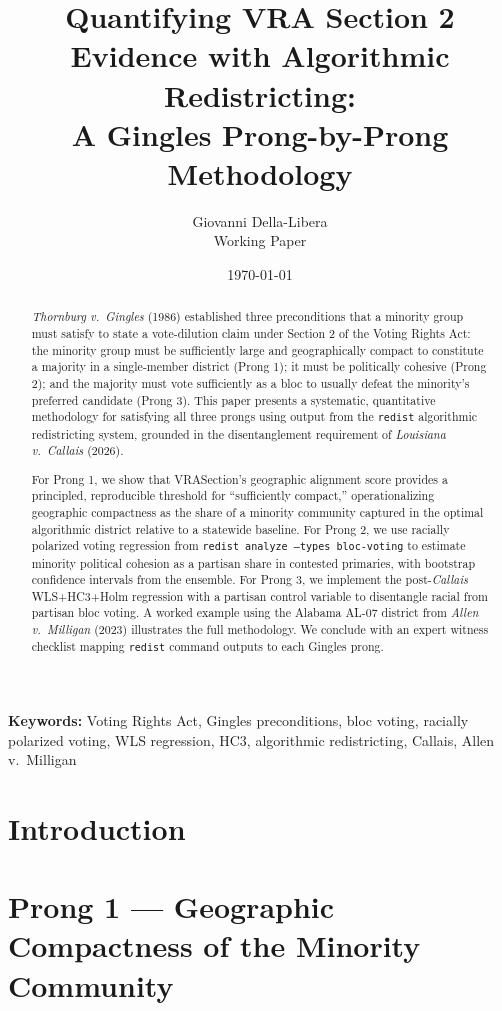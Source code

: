\documentclass[12pt]{article}
\title{Quantifying VRA Section 2 Evidence with Algorithmic Redistricting:\\
A Gingles Prong-by-Prong Methodology}
\author{Giovanni Della-Libera\\
\small{Working Paper}}
\date{\today}
\begin{document}
\maketitle

\begin{abstract}
\textit{Thornburg v.\ Gingles} (1986) established three preconditions
that a minority group must satisfy to state a vote-dilution claim under
Section 2 of the Voting Rights Act: the minority group must be sufficiently
large and geographically compact to constitute a majority in a
single-member district (Prong 1); it must be politically cohesive (Prong 2);
and the majority must vote sufficiently as a bloc to usually defeat the
minority's preferred candidate (Prong 3).  This paper presents a
systematic, quantitative methodology for satisfying all three prongs using
output from the \texttt{redist} algorithmic redistricting system, grounded in
the disentanglement requirement of \textit{Louisiana v.\ Callais} (2026).

For Prong 1, we show that VRASection's geographic alignment score provides
a principled, reproducible threshold for ``sufficiently compact,'' operationalizing
geographic compactness as the share of a minority community captured in the
optimal algorithmic district relative to a statewide baseline.  For Prong 2,
we use racially polarized voting regression from \texttt{redist analyze
--types bloc-voting} to estimate minority political cohesion as a partisan
share in contested primaries, with bootstrap confidence intervals from the
ensemble.  For Prong 3, we implement the post-\textit{Callais} WLS+HC3+Holm
regression with a partisan control variable to disentangle racial from partisan
bloc voting.  A worked example using the Alabama AL-07 district from
\textit{Allen v.\ Milligan} (2023) illustrates the full methodology.
We conclude with an expert witness checklist mapping \texttt{redist} command
outputs to each Gingles prong.
\end{abstract}

\noindent\textbf{Keywords:} Voting Rights Act, Gingles preconditions, bloc
voting, racially polarized voting, WLS regression, HC3, algorithmic
redistricting, Callais, Allen v.\ Milligan

\section{Introduction}


\section{Prong 1 --- Geographic Compactness of the Minority Community}

\end{document}
